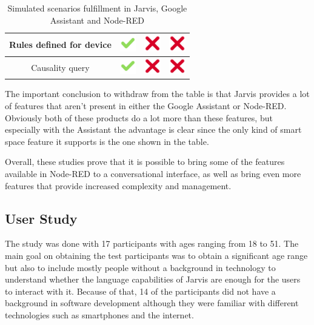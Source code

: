 \documentclass[runningheads]{llncs}
\begin{document}
\begin{table}
\begin{tabular}{ | c | c | c | c |}
    Rules defined for device &
    \includegraphics[width=20pt]{figures/checkmark} & 
    \includegraphics[width=20pt]{figures/cross} &
    \includegraphics[width=20pt]{figures/cross} \\ \hline
    
    Causality query &
    \includegraphics[width=20pt]{figures/checkmark} & 
    \includegraphics[width=20pt]{figures/cross} &
    \includegraphics[width=20pt]{figures/cross} \\ \hline
    \end{tabular}

    \caption{Simulated scenarios fulfillment in Jarvis, Google Assistant and Node-RED}
    \label{table:comparison}
\end{table}

The important conclusion to withdraw from the table is that Jarvis provides a lot of features that aren't present in either the Google Assistant or Node-RED. Obviously both of these products do a lot more than these features, but especially with the Assistant the advantage is clear since the only kind of smart space feature it supports is the one shown in the table.

Overall, these studies prove that it is possible to bring some of the features available in Node-RED to a conversational interface, as well as bring even more features that provide increased complexity and management.

\subsection{User Study}\label{sec:userstudy}

The study was done with 17 participants with ages ranging from 18 to 51. The main goal on obtaining the test participants was to obtain a significant age range but also to include mostly people without a background in technology to understand whether the language capabilities of Jarvis are enough for the users to interact with it. Because of that, 14 of the participants did not have a background in software development although they were familiar with different technologies such as smartphones and the internet.
\end{document}
